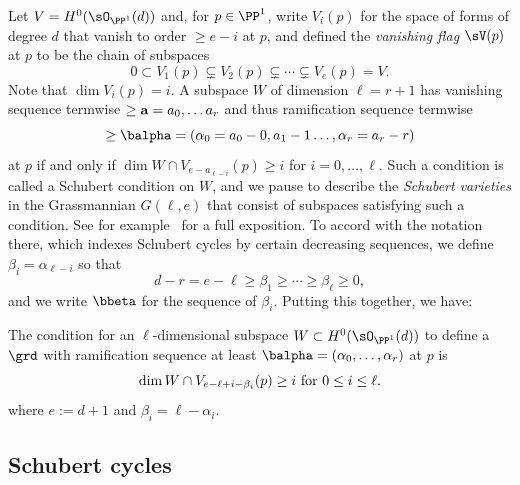 Let $V =H^{0}(\sO_{\PP^{1}}(d))$ and, for $p\in \PP^{1}$, write $V_{i}(p)$ for the space of
forms of degree $d$ that vanish to order $\geq e-i$ at $p$, and defined the \emph{vanishing flag} $\sV(p)$ at $p$
to be the chain of subspaces
$$
0\subset V_{1}(p) \subsetneq V_{2}(p) \subsetneq\cdots\subsetneq V_{e}(p) = V.
$$
Note that $\dim V_{i}(p) = i$.
A subspace $W$ of dimension $\ell = r+1$ has vanishing sequence termwise $\geq {\bf a} = a_{0}, \dots a_{r}$ and thus
ramification sequence termwise
$$
\geq \balpha = (\alpha_{0} = a_{0}-0, a_{1}-1 \dots, \alpha_{r}= a_{r}-r)
$$
 at $p$ if and only if
$\dim W\cap V_{e-a_{\ell-i}}(p)\geq  i$  for  $i = 0,\dots, \ell$.
Such a condition is called a Schubert condition
on $W$, and we pause to describe the \emph{Schubert varieties} in
the Grassmannian $G(\ell, e)$ that consist
of subspaces satisfying such a condition. See for example~\cite[Chapters 3 and 4]{3264} for a full exposition.
To accord with the notation there, which indexes Schubert cycles by certain decreasing sequences,
we define $\beta_{i} = \alpha_{\ell-i}$ so that
$$
d-r = e-\ell \geq \beta_{1} \geq \cdots \geq \beta_{\ell}\geq 0,
$$
and we write $\bbeta$ for the sequence of $\beta_{i}$. Putting this together, we have:
\begin{proposition}
The condition for an $\ell$-dimensional subspace $W \subset H^{0}(\sO_{\PP^{1}}(d))$
to define a $\grd$ with ramification sequence at least $\balpha =(\alpha_{0},\dots, \alpha_{r})$ at $p$ is
$$
\dim W\cap V_{e-\ell+i-\beta_{i}}(p)\geq  i \hbox{ for } 0\leq i \leq \ell.
$$
where $e:=d+1$ and $\beta_{i} = \ell-\alpha_{i}$.
\end{proposition}



\subsection{Schubert cycles}\label{Schubert1}

